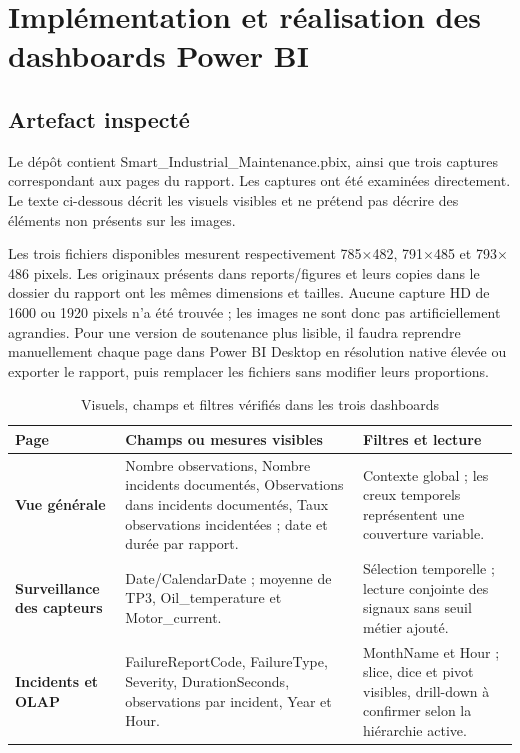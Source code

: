 \chapter{Implémentation et réalisation des dashboards Power BI}

\section{Artefact inspecté}
Le dépôt contient Smart\_Industrial\_Maintenance.pbix, ainsi que trois captures correspondant aux pages du rapport. Les captures ont été examinées directement. Le texte ci-dessous décrit les visuels visibles et ne prétend pas décrire des éléments non présents sur les images.

Les trois fichiers disponibles mesurent respectivement 785$\times$482, 791$\times$485 et 793$\times$486 pixels. Les originaux présents dans reports/figures et leurs copies dans le dossier du rapport ont les mêmes dimensions et tailles. Aucune capture HD de 1600 ou 1920 pixels n'a été trouvée ; les images ne sont donc pas artificiellement agrandies. Pour une version de soutenance plus lisible, il faudra reprendre manuellement chaque page dans Power BI Desktop en résolution native élevée ou exporter le rapport, puis remplacer les fichiers sans modifier leurs proportions.

\begin{table}[H]
\centering
\caption{Visuels, champs et filtres vérifiés dans les trois dashboards}
\label{tab:dashboard-fields}
\begin{tabularx}{\textwidth}{>{\bfseries}l X X}
\toprule
Page & Champs ou mesures visibles & Filtres et lecture\\
\midrule
Vue générale & Nombre observations, Nombre incidents documentés, Observations dans incidents documentés, Taux observations incidentées ; date et durée par rapport. & Contexte global ; les creux temporels représentent une couverture variable.\\
Surveillance des capteurs & Date/CalendarDate ; moyenne de TP3, Oil\_temperature et Motor\_current. & Sélection temporelle ; lecture conjointe des signaux sans seuil métier ajouté.\\
Incidents et OLAP & FailureReportCode, FailureType, Severity, DurationSeconds, observations par incident, Year et Hour. & MonthName et Hour ; slice, dice et pivot visibles, drill-down à confirmer selon la hiérarchie active.\\
\bottomrule
\end{tabularx}
\end{table}

